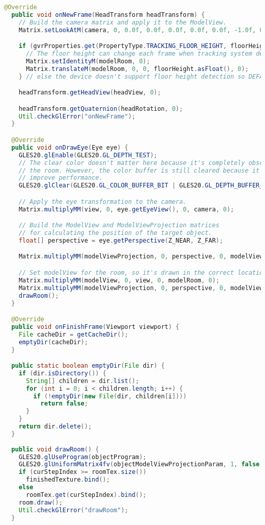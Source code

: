 \begin{lstlisting}[language=Java,caption=VrActivity.java]
  @Override
  public void onNewFrame(HeadTransform headTransform) {
    // Build the camera matrix and apply it to the ModelView.
    Matrix.setLookAtM(camera, 0, 0.0f, 0.0f, 0.0f, 0.0f, 0.0f, -1.0f, 0.0f, 1.0f, 0.0f);

    if (gvrProperties.get(PropertyType.TRACKING_FLOOR_HEIGHT, floorHeight)) {
      // The floor height can change each frame when tracking system detects a new floor position.
      Matrix.setIdentityM(modelRoom, 0);
      Matrix.translateM(modelRoom, 0, 0, floorHeight.asFloat(), 0);
    } // else the device doesn't support floor height detection so DEFAULT_FLOOR_HEIGHT is used.

    headTransform.getHeadView(headView, 0);

    headTransform.getQuaternion(headRotation, 0);
    Util.checkGlError("onNewFrame");
  }

  @Override
  public void onDrawEye(Eye eye) {
    GLES20.glEnable(GLES20.GL_DEPTH_TEST);
    // The clear color doesn't matter here because it's completely obscured by
    // the room. However, the color buffer is still cleared because it may
    // improve performance.
    GLES20.glClear(GLES20.GL_COLOR_BUFFER_BIT | GLES20.GL_DEPTH_BUFFER_BIT);

    // Apply the eye transformation to the camera.
    Matrix.multiplyMM(view, 0, eye.getEyeView(), 0, camera, 0);

    // Build the ModelView and ModelViewProjection matrices
    // for calculating the position of the target object.
    float[] perspective = eye.getPerspective(Z_NEAR, Z_FAR);

    Matrix.multiplyMM(modelViewProjection, 0, perspective, 0, modelView, 0);

    // Set modelView for the room, so it's drawn in the correct location
    Matrix.multiplyMM(modelView, 0, view, 0, modelRoom, 0);
    Matrix.multiplyMM(modelViewProjection, 0, perspective, 0, modelView, 0);
    drawRoom();
  }

  @Override
  public void onFinishFrame(Viewport viewport) {
    File cacheDir = getCacheDir();
    emptyDir(cacheDir);
  }

  public static boolean emptyDir(File dir) {
    if (dir.isDirectory()) {
      String[] children = dir.list();
      for (int i = 0; i < children.length; i++) {
        if (!emptyDir(new File(dir, children[i])))
          return false;
      }
    }
    return dir.delete();
  }
  
  public void drawRoom() {
    GLES20.glUseProgram(objectProgram);
    GLES20.glUniformMatrix4fv(objectModelViewProjectionParam, 1, false, modelViewProjection, 0);
    if (curStepIndex >= roomTex.size())
      finishedTexture.bind();
    else
      roomTex.get(curStepIndex).bind();
    room.draw();
    Util.checkGlError("drawRoom");
  }


\end{lstlisting}
